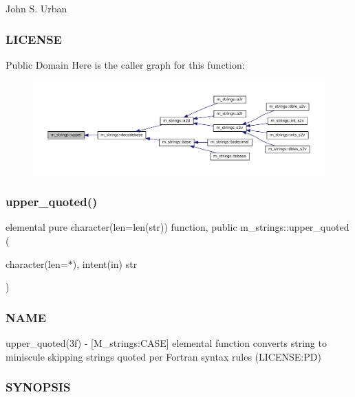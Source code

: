 John S. Urban \subsubsection*{L\+I\+C\+E\+N\+SE}

Public Domain Here is the caller graph for this function\+:\nopagebreak
\begin{figure}[H]
\begin{center}
\leavevmode
\includegraphics[width=350pt]{namespacem__strings_a0953ac5c4d31339fdd8ec3acc9c3c915_icgraph}
\end{center}
\end{figure}
\mbox{\label{namespacem__strings_a3bd3b1de054c81fcc18b69afc369fb21}} 
\subsubsection{\texorpdfstring{upper\+\_\+quoted()}{upper\_quoted()}}
{\footnotesize\ttfamily elemental pure character(len=len(str)) function, public m\+\_\+strings\+::upper\+\_\+quoted (\begin{DoxyParamCaption}\item[{character(len=$\ast$), intent(in)}]{str }\end{DoxyParamCaption})}



\subsubsection*{N\+A\+ME}

upper\+\_\+quoted(3f) -\/ \mbox{[}M\+\_\+strings\+:C\+A\+SE\mbox{]} elemental function converts string to miniscule skipping strings quoted per Fortran syntax rules (L\+I\+C\+E\+N\+SE\+:PD) 

\subsubsection*{S\+Y\+N\+O\+P\+S\+IS}

